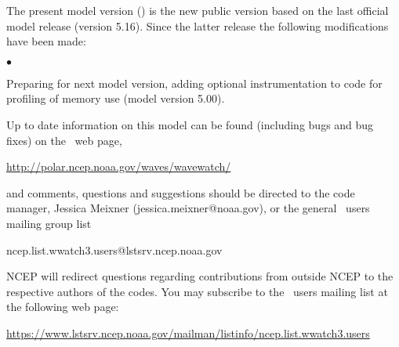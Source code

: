 \vspace{\baselineskip} 
\noindent 
The present model version (\WWver) is the new public version based on the
last official model release (version 5.16). Since the latter release the
following modifications have been made:

\begin{list}{$\bullet$}{\rightmargin 5mm \parsep 0mm \itemsep 0mm}

\item Preparing for next model version, adding optional instrumentation to code
      for profiling of memory use (model version 5.00). 

\end{list}

\vspace{\baselineskip} \noindent 
Up to date information on this model can be found (including bugs and bug
fixes) on the \ws\ web page, 
\begin{center}
\url{http://polar.ncep.noaa.gov/waves/wavewatch/}
\end{center}
and comments, questions and suggestions should be
directed to the code manager, Jessica Meixner (jessica.meixner@noaa.gov), or the general \ws\ users mailing group list

\begin{center}
ncep.list.wwatch3.users@lstsrv.ncep.noaa.gov
\end{center}

\noindent
NCEP will redirect questions regarding contributions from outside NCEP to the
respective authors of the codes. You may subscribe to the \ws\ users 
mailing list at the following web page:
\begin{center}
\footnotesize
\url{https://www.lstsrv.ncep.noaa.gov/mailman/listinfo/ncep.list.wwatch3.users}
\end{center} 

